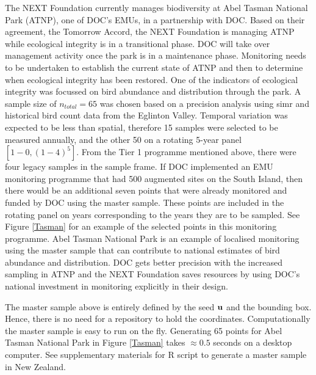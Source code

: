 \documentclass[titlepage]{article}
\begin{document}
The NEXT Foundation currently manages biodiversity at Abel Tasman National Park (ATNP), one of DOC's EMUs, in a partnership with DOC. Based on their agreement, the Tomorrow Accord, the NEXT Foundation is managing ATNP while ecological integrity is in a transitional phase. DOC will take over management activity once the park is in a maintenance phase. Monitoring needs to be undertaken to establish the current state of ATNP and then to determine when ecological integrity has been restored. One of the indicators of ecological integrity was focussed on bird abundance and distribution through the park. A sample size of $n_{total} = 65$ was chosen based on a precision analysis using simr \citep{simr} and historical bird count data from the Eglinton Valley. Temporal variation was expected to be less than spatial, therefore 15 samples were selected to be measured annually, and the other 50 on a rotating 5-year panel $[1-0,(1-4)^5]$. From the Tier 1 programme mentioned above, there were four legacy samples in the sample frame. If DOC implemented an EMU monitoring programme that had 500 augmented sites on the South Island, then there would be an additional seven points that were already monitored and funded by DOC using the master sample. These points are included in the rotating panel on years corresponding to the years they are to be sampled. See Figure \ref{Tasman} for an example of the selected points in this monitoring programme. Abel Tasman National Park is an example of localised monitoring using the master sample that can contribute to national estimates of bird abundance and distribution. DOC gets better precision with the increased sampling in ATNP and the NEXT Foundation saves resources by using DOC's national investment in monitoring explicitly in their design.

The master sample above is entirely defined by the seed ${\bf u}$ and the bounding box. Hence, there is no need for a repository to hold the coordinates. Computationally the master sample is easy to run on the fly. Generating 65 points for Abel Tasman National Park in Figure \ref{Tasman} takes $\approx 0.5$ seconds on a desktop computer. See supplementary materials for R script to generate a master sample in New Zealand.
\end{document}
